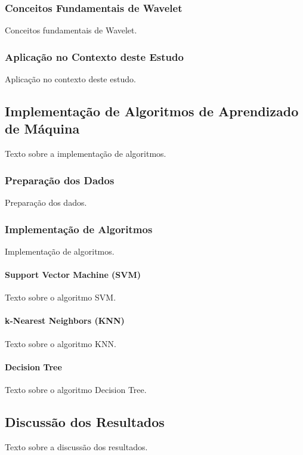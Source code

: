 \documentclass{article}
\begin{document}
\subsubsection{Conceitos Fundamentais de Wavelet}
Conceitos fundamentais de Wavelet.
\label{subsubsec:conceitos-wavelet}

\subsubsection{Aplicação no Contexto deste Estudo}
Aplicação no contexto deste estudo.
\label{subsubsec:aplicacao-wavelet}

\subsection{Implementação de Algoritmos de Aprendizado de Máquina}
Texto sobre a implementação de algoritmos.
\label{subsec:implementacao-algoritmos}

\subsubsection{Preparação dos Dados}
Preparação dos dados.
\label{subsubsec:preparacao-dados}

\subsubsection{Implementação de Algoritmos}
Implementação de algoritmos.
\label{subsubsec:implementacao-algoritmos}

\paragraph{Support Vector Machine (SVM)}
Texto sobre o algoritmo SVM.
\label{par:svm}

\paragraph{k-Nearest Neighbors (KNN)}
Texto sobre o algoritmo KNN.
\label{par:knn}

\paragraph{Decision Tree}
Texto sobre o algoritmo Decision Tree.
\label{par:decision-tree}

\subsection{Discussão dos Resultados}
Texto sobre a discussão dos resultados.
\label{subsec:discussao-resultados}
\end{document}
